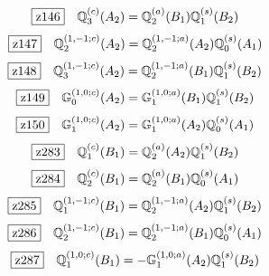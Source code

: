 \documentclass[fleqn,10pt,landscape]{jsarticle}
\begin{document}
\begin{dmath*}
\hspace*{3mm}\fbox{z146}\quad \mathbb{Q}_{3}^{(c)}(A_{2})=\mathbb{Q}_{2}^{(a)}(B_{1}) \mathbb{Q}_{1}^{(s)}(B_{2})
\end{dmath*}
\begin{dmath*}
\hspace*{3mm}\fbox{z147}\quad \mathbb{Q}_{2}^{(1,-1;c)}(A_{2})=\mathbb{Q}_{2}^{(1,-1;a)}(A_{2}) \mathbb{Q}_{0}^{(s)}(A_{1})
\end{dmath*}
\begin{dmath*}
\hspace*{3mm}\fbox{z148}\quad \mathbb{Q}_{3}^{(1,-1;c)}(A_{2})=\mathbb{Q}_{2}^{(1,-1;a)}(B_{1}) \mathbb{Q}_{1}^{(s)}(B_{2})
\end{dmath*}
\begin{dmath*}
\hspace*{3mm}\fbox{z149}\quad \mathbb{G}_{0}^{(1,0;c)}(A_{2})=\mathbb{G}_{1}^{(1,0;a)}(B_{1}) \mathbb{Q}_{1}^{(s)}(B_{2})
\end{dmath*}
\begin{dmath*}
\hspace*{3mm}\fbox{z150}\quad \mathbb{G}_{1}^{(1,0;c)}(A_{2})=\mathbb{G}_{1}^{(1,0;a)}(A_{2}) \mathbb{Q}_{0}^{(s)}(A_{1})
\end{dmath*}
\begin{dmath*}
\hspace*{3mm}\fbox{z283}\quad \mathbb{Q}_{1}^{(c)}(B_{1})=\mathbb{Q}_{2}^{(a)}(A_{2}) \mathbb{Q}_{1}^{(s)}(B_{2})
\end{dmath*}
\begin{dmath*}
\hspace*{3mm}\fbox{z284}\quad \mathbb{Q}_{2}^{(c)}(B_{1})=\mathbb{Q}_{2}^{(a)}(B_{1}) \mathbb{Q}_{0}^{(s)}(A_{1})
\end{dmath*}
\begin{dmath*}
\hspace*{3mm}\fbox{z285}\quad \mathbb{Q}_{1}^{(1,-1;c)}(B_{1})=\mathbb{Q}_{2}^{(1,-1;a)}(A_{2}) \mathbb{Q}_{1}^{(s)}(B_{2})
\end{dmath*}
\begin{dmath*}
\hspace*{3mm}\fbox{z286}\quad \mathbb{Q}_{2}^{(1,-1;c)}(B_{1})=\mathbb{Q}_{2}^{(1,-1;a)}(B_{1}) \mathbb{Q}_{0}^{(s)}(A_{1})
\end{dmath*}
\begin{dmath*}
\hspace*{3mm}\fbox{z287}\quad \mathbb{Q}_{1}^{(1,0;c)}(B_{1})=- \mathbb{G}_{1}^{(1,0;a)}(A_{2}) \mathbb{Q}_{1}^{(s)}(B_{2})
\end{dmath*}
\end{document}
